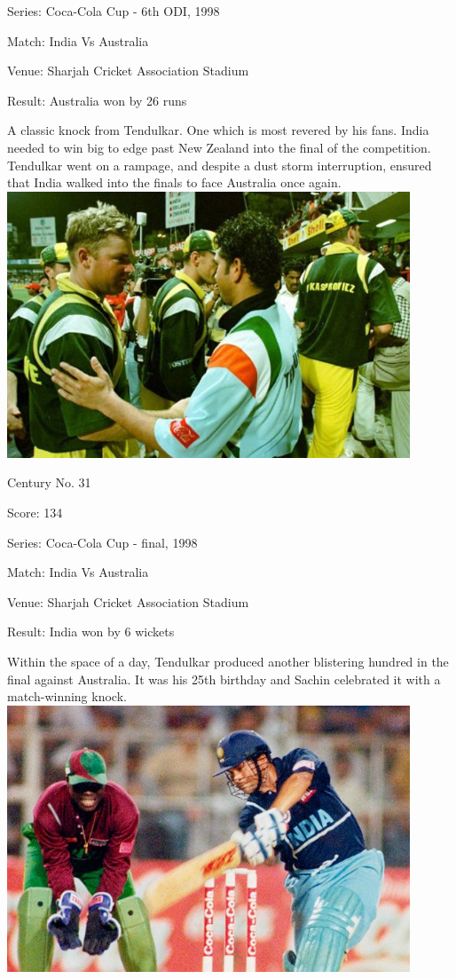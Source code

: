 \documentclass[11pt, a4paper]{article}
\begin{document}
Series: Coca-Cola Cup - 6th ODI, 1998

Match: India Vs Australia

Venue: Sharjah Cricket Association Stadium

Result: Australia won by 26 runs

A classic knock from Tendulkar. One which is most revered by his fans. India needed to win big to edge past New Zealand into the final of the competition. Tendulkar went on a rampage, and despite a dust storm interruption, ensured that India walked into the finals to face Australia once again.
\newpage
\includegraphics[width=0.9\textwidth]{pics/31.jpg}

Century No. 31

Score: 134

Series: Coca-Cola Cup - final, 1998

Match: India Vs Australia

Venue: Sharjah Cricket Association Stadium

Result: India won by 6 wickets

Within the space of a day, Tendulkar produced another blistering hundred in the final against Australia. It was his 25th birthday and Sachin celebrated it with a match-winning knock.
\newpage
\includegraphics[width=0.9\textwidth]{pics/32.jpg}
\end{document}
